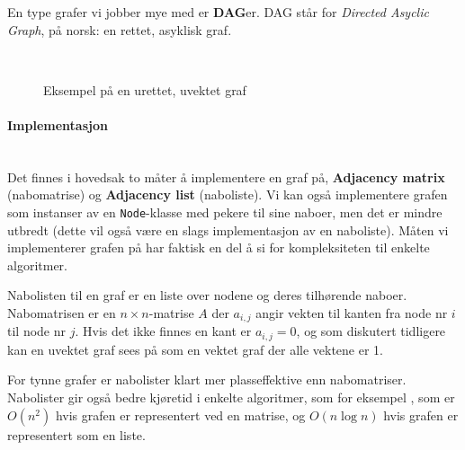 En type grafer vi jobber mye med er \textbf{DAG}er. DAG står for \emph{Directed Asyclic Graph}, på norsk: en rettet, asyklisk graf. 


\begin{figure}[H]
\centering
\caption{Eksempel på en urettet, uvektet graf}~\\
\label{fig:graf}
\end{figure}


\paragraph{Implementasjon}~\\
Det finnes i hovedsak to måter å implementere en graf på, \textbf{Adjacency matrix} (nabomatrise) og \textbf{Adjacency list} (naboliste). Vi kan også implementere grafen som instanser av en \verb|Node|-klasse med pekere til sine naboer, men det er mindre utbredt (dette vil også være en slags implementasjon av en naboliste). Måten vi implementerer grafen på har faktisk en del å si for kompleksiteten til enkelte algoritmer.

Nabolisten til en graf er en liste over nodene og deres tilhørende naboer. Nabomatrisen er en $ n\times n $-matrise $ A $ der $ a_{i, j} $ angir vekten til kanten fra node nr $ i $ til node nr $ j $. Hvis det ikke finnes en kant er $ a_{i, j} = 0 $, og som diskutert tidligere kan en uvektet graf sees på som en vektet graf der alle vektene er 1.

For tynne grafer er nabolister klart mer plasseffektive enn nabomatriser. Nabolister gir også bedre kjøretid i enkelte algoritmer, som for eksempel , som er $ O(n^2) $ hvis grafen er representert ved en matrise, og $ O(n\log n) $ hvis grafen er representert som en liste.


